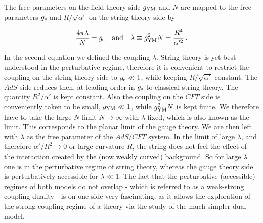 %
%
\noindent The free parameters on the field theory side $g_{\rm YM}$ and $N$ are mapped to the free parameters $g_{\rm s}$ and $R/\sqrt{\alpha'}$ on the string theory side by
%
%
\begin{tcolorbox}[colback=white!95!black, colframe=white!90!black]
\begin{equation}
\frac{4\pi \lambda}{N} =  g_{\rm s} \quad {\rm and} \quad \lambda \equiv g_{\rm YM}^{2}N = \frac{R^{4}}{\alpha'^{2}}\,.
\label{eq: adscft_map}
\end{equation}
\end{tcolorbox}
%
%
In the second equation we defined the  coupling $\lambda$. String theory is yet best understood in the perturbative regime, therefore it is convenient to restrict the coupling on the string theory side to $g_{\rm s}\ll 1$, while keeping $R/\sqrt{\alpha'}$ constant. The $AdS$ side reduces then, at leading order in $g_{\rm s}$ to classical string theory. The quantity $R^{2}/\alpha'$ is kept constant.  Also the coupling on the $CFT$ side is conveniently taken to be small, $g_{\rm YM} \ll 1$, while $g_{\rm YM}^{2}N$ is kept finite. We therefore have to take the large $N$ limit $N \to \infty$ with $\lambda$ fixed, which is also known as the  limit. This corresponds to the planar limit of the gauge theory. We are then left with $\lambda$ as the free parameter of the $AdS/CFT$ system. In the limit of large $\lambda$, and therefore $\alpha'/R^{2}\to 0$ or large curvature $R$, the string does not feel the effect of the interaction created by the (now weakly curved) background. So for large $\lambda$ one is in the perturbative regime of string theory, whereas the gauge theory side is perturbatively accessible for $\lambda \ll 1$.
%
%
The fact that the perturbative (accessible) regimes of both models do not overlap - which is referred to as a weak-strong coupling duality - is on one side very fascinating, as it allows the exploration of the strong coupling regime of a theory via the study of the much simpler dual model.
